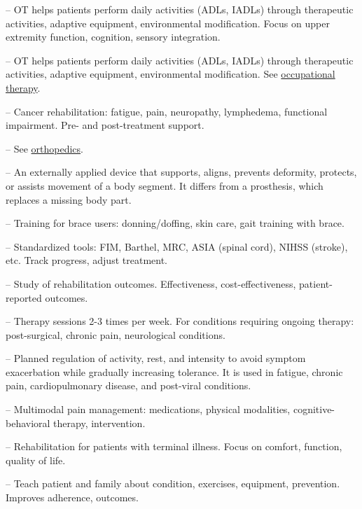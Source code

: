 -- OT helps patients perform daily activities (ADLs, IADLs) through therapeutic activities, adaptive equipment, environmental modification. Focus on upper extremity function, cognition, sensory integration.


-- OT helps patients perform daily activities (ADLs, IADLs) through therapeutic activities, adaptive equipment, environmental modification. See \hyperlink{Occupational Therapy}{occupational therapy}.

-- Cancer rehabilitation: fatigue, pain, neuropathy, lymphedema, functional impairment. Pre- and post-treatment support.

-- See \hyperlink{orthopedics}{orthopedics}.

-- An externally applied device that supports, aligns, prevents deformity, protects, or assists movement of a body segment. It differs from a prosthesis, which replaces a missing body part.

-- Training for brace users: donning/doffing, skin care, gait training with brace.

-- Standardized tools: FIM, Barthel, MRC, ASIA (spinal cord), NIHSS (stroke), etc. Track progress, adjust treatment.

-- Study of rehabilitation outcomes. Effectiveness, cost-effectiveness, patient-reported outcomes.

-- Therapy sessions 2-3 times per week. For conditions requiring ongoing therapy: post-surgical, chronic pain, neurological conditions.


-- Planned regulation of activity, rest, and intensity to avoid symptom exacerbation while gradually increasing tolerance. It is used in fatigue, chronic pain, cardiopulmonary disease, and post-viral conditions.

-- Multimodal pain management: medications, physical modalities, cognitive-behavioral therapy, intervention.

-- Rehabilitation for patients with terminal illness. Focus on comfort, function, quality of life.

-- Teach patient and family about condition, exercises, equipment, prevention. Improves adherence, outcomes.

